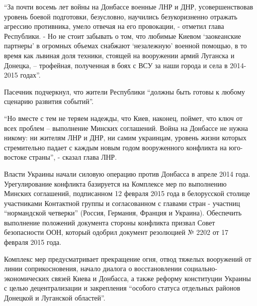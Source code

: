 \enquote{За почти восемь лет войны на Донбассе военные ЛНР и ДНР, усовершенствовав
уровень боевой подготовки, безусловно, научились безукоризненно отражать
агрессию противника, умело отвечая на его провокации, - отметил глава
Республики. - Но не стоит забывать о том, что любимые Киевом \enquote{заокеанские
партнеры} в огромных объемах снабжают \enquote{незалежную} военной помощью, в то время
как львиная доля техники, стоящей на вооружении армий Луганска и Донецка, –
трофейная, полученная в боях с ВСУ за наши города и села в 2014-2015 годах}.

Пасечник подчеркнул, что жители Республики \enquote{должны быть готовы к любому
сценарию развития событий}.

\enquote{Но вместе с тем не теряем надежды, что Киев, наконец, поймет, что ключ от всех
проблем – выполнение Минских соглашений. Война на Донбассе не нужна никому: ни
жителям ЛНР и ДНР, ни самим украинцам, уровень жизни которых стремительно
падает с каждым новым годом вооруженного конфликта на юго-востоке страны}, -
сказал глава ЛНР.

Власти Украины начали силовую операцию против Донбасса в апреле 2014 года.
Урегулирование конфликта базируется на Комплексе мер по выполнению Минских
соглашений, подписанном 12 февраля 2015 года в белорусской столице участниками
Контактной группы и согласованном с главами стран - участниц \enquote{нормандской
четверки} (Россия, Германия, Франция и Украина). Обеспечить выполнение
положений документа стороны конфликта призвал Совет безопасности ООН, который
одобрил документ резолюцией № 2202 от 17 февраля 2015 года.

Комплекс мер предусматривает прекращение огня, отвод тяжелых вооружений от
линии соприкосновения, начало диалога о восстановлении социально-экономических
связей Киева и Донбасса, а также реформу конституции Украины с целью
децентрализации и закрепления \enquote{особого статуса отдельных районов Донецкой и
Луганской областей}.
